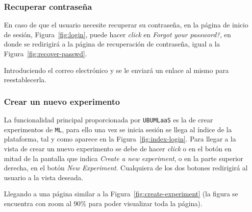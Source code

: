 
\subsubsection{Recuperar contraseña}
En caso de que el usuario necesite recuperar su contraseña, en la página de inicio de sesión, Figura~\ref{fig:login}, puede hacer \textit{click} en \textit{Forgot your password?}, en donde se redirigirá a la página de recuperación de contraseña, igual a la Figura~\ref{fig:recover-passwd}. 

Introduciendo el correo electrónico y se le enviará un enlace al mismo para reestablecerla.


\subsubsection{Crear un nuevo experimento}
La funcionalidad principal proporcionada por \texttt{UBUMLaaS} es la de crear experimentos de \texttt{ML}, para ello una vez se inicia sesión se llega al índice de la plataforma, tal y como aparece en la Figura~\ref{fig:index-login}. Para llegar a la vista de crear un nuevo experimento se debe de hacer \textit{click} o en el botón en mitad de la pantalla que indica \textit{Create a new experiment}, o en la parte superior derecha, en el botón \textit{New Experiment}. Cualquiera de los dos botones redirigirá al usuario a la vista deseada.


Llegando a una página similar a la Figura~\ref{fig:create-experiment} (la figura se encuentra con zoom al 90\% para poder visualizar toda la página). 

